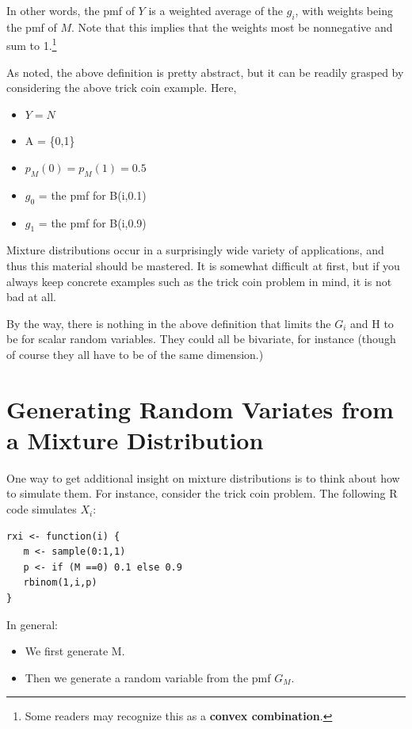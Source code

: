 In other words, the pmf of $Y$ is a weighted average of the $g_i$, with
weights being the pmf of $M$.  Note that this implies that the weights
most be nonnegative and sum to 1.\footnote{Some readers may recognize
this as a {\bf convex combination}.}

As noted, the above definition is pretty abstract, but it can be readily
grasped by considering the above trick coin example.  Here,

\begin{itemize}

\item $Y = N$

\item A = \{0,1\}

\item $p_M(0) = p_M(1) = 0.5$

\item $g_0$ = the pmf for B(i,0.1)

\item $g_1$ = the pmf for B(i,0.9)

\end{itemize}

Mixture distributions occur in a surprisingly wide variety of
applications, and thus this material should be mastered.  It is somewhat
difficult at first, but if you always keep concrete examples such as the
trick coin problem in mind, it is not bad at all.

By the way, there is nothing in the above definition that limits the
$G_i$ and H to be for scalar random variables.  They could all be
bivariate, for instance (though of course they all have to be of the
same dimension.)

\section{Generating Random Variates from a Mixture Distribution}

One way to get additional insight on mixture distributions is to think
about how to simulate them.  For instance, consider the trick coin problem.
The following R code simulates $X_i$:

\begin{lstlisting}
rxi <- function(i) {
   m <- sample(0:1,1)
   p <- if (M ==0) 0.1 else 0.9
   rbinom(1,i,p)
}
\end{lstlisting}

In general:

\begin{itemize}

\item We first generate M.

\item Then we generate a random variable from the pmf $G_M$.

\end{itemize}

